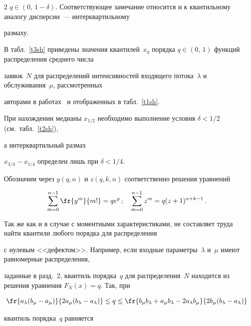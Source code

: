 \begin{multicols}{2}
$q\in(0,\,1-\delta)$. Соответствующее замечание относится и к квантильному аналогу дисперсии~--- интерквартильному 


размаху.





В табл.~\ref{t3sh} приведены значения квантилей~$x_q$ порядка $q\in(0,\, 1)$ функций распределения среднего числа


заявок~$N$ для распределений интенсивностей входящего потока~$\lambda$ и обслуживания~$\mu$, рассмотренных


авторами в работах~\cite{KuSh07, KuSh09a, KuSh09b} и отображенных в табл.~\ref{t1sh}.





При нахождении медианы $x_{1/2}$ необходимо выполнение условия $\delta<1/2$ (см.\ табл.~\ref{t2sh}), 


а интерквартильный размах


$x_{3/4}-x_{1/4}$ определен лишь при $\delta<1/4$.





Обозначим через $y(q,n)$ и $z(q,k,n)$ соответственно решения уравнений


\begin{equation}


\sum\limits_{m=0}^{n-1}\fr{y^m}{m!}=qe^y\,;\quad \sum\limits_{m=0}^{n-1}z^m=q(z+1)^{n+k-1}\,.


\label{e6sh}


\end{equation}





Так же как и в случае с моментными характеристиками, не составляет труда найти квантили любого порядка для распределения


с нулевым <<дефектом>>. Например, если входные параметры~$\lambda$ и~$\mu$ имеют равномерные распределения,


заданные в разд.~2, квантиль порядка~$q$ для распределения~$N$ находится из решения уравнения $F_N(x)=q$. Так, при


$$


\fr{a_\lambda(b_\mu-a_\mu)}{2a_\mu(b_\lambda-a_\lambda)}\le q\le\fr{b_\mu b_\lambda+a_\mu b_\lambda-2a_\lambda


b_\mu}{2b_\mu(b_\lambda-a_\lambda)}


$$


квантиль порядка~$q$ равняется



\end{multicols}
